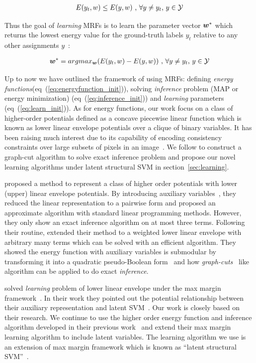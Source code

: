 \documentclass[sigconf, anonymous, review]{acmart}
\renewcommand{\citename}{\citet}
\renewcommand{\cite}{\citep}
\begin{document}
\begin{align}
E(y_t,w)\leq E(y,w)~ \text{,~}\forall y \neq y_t
\text{,~} y\in {\cal Y}
\end{align}


Thus the goal of \emph{learning} MRFs is to learn the parameter
vector ${\boldsymbol{w}}^*$ which returns the lowest energy value for the
ground-truth labels $y_t$ relative to any other assignments
$y$~\cite{Szummer:ECCV08}:

\begin{align}
  \label{eq:learn_init}
{\boldsymbol{w}}^* = argmax_{{\boldsymbol{w}}}(E(y_t,w)-E(y,w))~ \text{,~}\forall y \neq y_t
\text{,~} y\in {\cal Y}
\end{align}

Up to now we have outlined the framework of using MRFs: defining
\emph{energy functions}(eq~(\ref{eq:energyfunction_init})),
solving \emph{inference} problem (MAP or energy minimization)
(eq~(\ref{eq:inference_init})) and \emph{learning} parameters
(eq~(\ref{eq:learn_init})). As for energy functions, our work
focus on a class of higher-order potentials defined as a concave
piecewise linear function which is known as lower linear envelope
potentials over a clique of binary variables. It has been raising
much interest due to its capability of encoding consistency
constraints over large subsets of pixels in an
image~\cite{Kohli:CVPR07,Nowozin:2011}. We follow
\citename{gouldlearning} to construct a graph-cut algorithm to
solve exact inference problem and propose our novel learning
algorithms under latent structural SVM in
section~\ref{sec:learning}.

\citename{kohli2009robust} proposed a method to represent a class
of higher order potentials with lower (upper) linear envelope
potentials. By introducing auxiliary
variables~\cite{Kohli:CVPR10}, they reduced the linear
representation to a pairwise form and proposed an approximate
algorithm with standard linear programming methods. However, they
only show an exact inference algorithm on at most three terms.
Following their routine, \citename{gouldlearning} extended their
method to a weighted lower linear envelope with arbitrary many
terms which can be solved with an efficient algorithm. They
showed the energy function with auxiliary variables is submodular
by transforming it into a quadratic pseudo-Boolean
form~\cite{Boros:MATH02} and how
\emph{graph-cuts}~\cite{Hammer:1965, Boykov:ICCV01, Freedman:CVPR05} like
algorithm can be applied to do exact \emph{inference}.

\citename{gouldlearning} solved \emph{learning} problem of lower
linear envelope under the max margin
framework~\cite{tsochantaridis2005large}. In their work they
pointed out the potential relationship between their auxiliary
representation and latent SVM~\cite{yu2009learning}. Our work is
closely based on their research. We continue to use the higher
order energy function and inference algorithm developed in their
previous work~\cite{Gould:ICML2011} and extend their max margin
learning algorithm to include latent variables. The learning
algorithm we use is an extension of max margin framework which is
known as ``latent structural SVM''~\cite{yu2009learning}.
\end{document}
